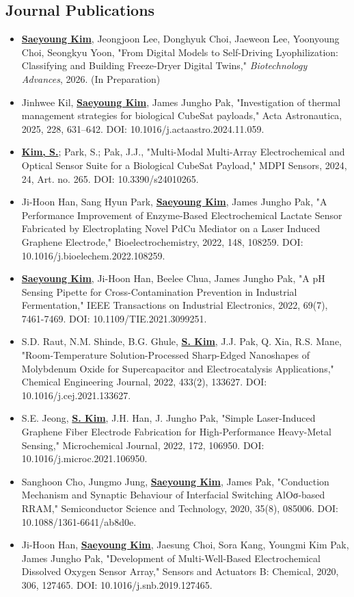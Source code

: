\documentclass[letterpaper,11pt]{moderncv}
\begin{document}
\subsection{Journal Publications}
\begin{sloppypar} %
\begin{itemize}[leftmargin=1cm, itemsep=0pt, parsep=0pt]
    \item \textbf{\underline{Saeyoung Kim}}, Jeongjoon Lee, Donghyuk Choi, Jaeweon Lee, Yoonyoung Choi, Seongkyu Yoon, "From Digital Models to Self-Driving Lyophilization: Classifying and Building Freeze-Dryer Digital Twins," \textit{Biotechnology Advances}, 2026. (In Preparation)
    \item Jinhwee Kil, \textbf{\underline{Saeyoung Kim}}, James Jungho Pak, "Investigation of thermal management strategies for biological CubeSat payloads," Acta Astronautica, 2025, 228, 631--642. DOI: 10.1016/j.actaastro.2024.11.059.
    \item \textbf{\underline{Kim, S.}}; Park, S.; Pak, J.J., "Multi-Modal Multi-Array Electrochemical and Optical Sensor Suite for a Biological CubeSat Payload," MDPI Sensors, 2024, 24, Art. no. 265. DOI: 10.3390/s24010265.
    \item Ji-Hoon Han, Sang Hyun Park, \textbf{\underline{Saeyoung Kim}}, James Jungho Pak, "A Performance Improvement of Enzyme-Based Electrochemical Lactate Sensor Fabricated by Electroplating Novel PdCu Mediator on a Laser Induced Graphene Electrode," Bioelectrochemistry, 2022, 148, 108259. DOI: 10.1016/j.bioelechem.2022.108259.
    \item \textbf{\underline{Saeyoung Kim}}, Ji-Hoon Han, Beelee Chua, James Jungho Pak, "A pH Sensing Pipette for Cross-Contamination Prevention in Industrial Fermentation," IEEE Transactions on Industrial Electronics, 2022, 69(7), 7461-7469. DOI: 10.1109/TIE.2021.3099251.
    \item S.D. Raut, N.M. Shinde, B.G. Ghule, \textbf{\underline{S. Kim}}, J.J. Pak, Q. Xia, R.S. Mane, "Room-Temperature Solution-Processed Sharp-Edged Nanoshapes of Molybdenum Oxide for Supercapacitor and Electrocatalysis Applications," Chemical Engineering Journal, 2022, 433(2), 133627. DOI: 10.1016/j.cej.2021.133627.
    \item S.E. Jeong, \textbf{\underline{S. Kim}}, J.H. Han, J. Jungho Pak, "Simple Laser-Induced Graphene Fiber Electrode Fabrication for High-Performance Heavy-Metal Sensing," Microchemical Journal, 2022, 172, 106950. DOI: 10.1016/j.microc.2021.106950.
    \item Sanghoon Cho, Jungmo Jung, \textbf{\underline{Saeyoung Kim}}, James Pak, "Conduction Mechanism and Synaptic Behaviour of Interfacial Switching AlOσ-based RRAM," Semiconductor Science and Technology, 2020, 35(8), 085006. DOI: 10.1088/1361-6641/ab8d0e.
    \item Ji-Hoon Han, \textbf{\underline{Saeyoung Kim}}, Jaesung Choi, Sora Kang, Youngmi Kim Pak, James Jungho Pak, "Development of Multi-Well-Based Electrochemical Dissolved Oxygen Sensor Array," Sensors and Actuators B: Chemical, 2020, 306, 127465. DOI: 10.1016/j.snb.2019.127465.
\end{itemize}
\end{sloppypar}
\end{document}
